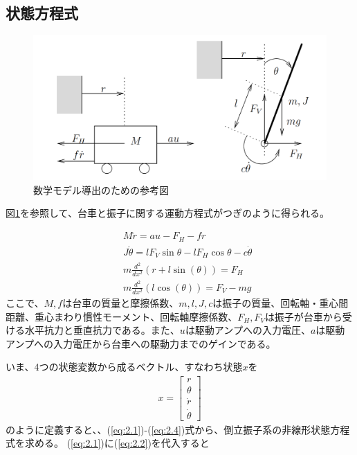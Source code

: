 \documentclass[a4j,11pt,twoside]{ujbook}
\begin{document}
\subsection{状態方程式}
\begin{figure}[htbp]
	\begin{center}
		\includegraphics[width = 0.6 \linewidth]{modeling.png}
		\caption{数学モデル導出のための参考図}
		\label{fig:数式モデル導出のための参考図}
	\end{center}
\end{figure}

図\ref{fig:数式モデル導出のための参考図}を参照して、台車と振子に関する運動方程式がつぎのように得られる。

\begin{eqnarray}
&&M \ddot{r} = au - F_H - f \dot{r}
\label{eq:2.1}\\
&&J \ddot{\theta} = lF_V\sin{\theta} - lF_H\cos{\theta} - c\dot{\theta}
\label{eq:2.2}\\
&&m \frac{d^2}{dx^2} (r + l\sin(\theta))  =  F_H
\label{eq:2.3}\\
&&m \frac{d^2}{dx^2} (l\cos(\theta))  =  F_V - mg
\label{eq:2.4}
\end{eqnarray}
ここで、$M,f$は台車の質量と摩擦係数、$m,l,J,c$は振子の質量、回転軸・重心間距離、重心まわり慣性モーメント、回転軸摩擦係数、$F_H,F_V$は振子が台車から受ける水平抗力と垂直抗力である。また、$u$は駆動アンプへの入力電圧、$a$は駆動アンプへの入力電圧から台車への駆動力までのゲインである。

いま、4つの状態変数から成るベクトル、すなわち状態$x$を
\begin{eqnarray*}
	x=\left[
	\begin{array}{c}
		r\\
		\theta\\
		\dot{r}\\
		\dot{\theta}
	\end{array}
	\right]
\end{eqnarray*}
のように定義すると、、(\ref{eq:2.1})-(\ref{eq:2.4})式から、倒立振子系の非線形状態方程式を求める。
(\ref{eq:2.1})に(\ref{eq:2.2})を代入すると
\end{document}
